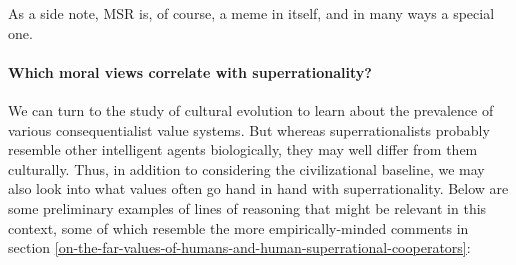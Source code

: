 As a side note, MSR is, of course, a meme in itself, and in many ways a
special one.

\paragraph{Which moral views correlate with
superrationality?}\label{which-moral-views-correlate-with-superrationality}

We can turn to the study of cultural evolution to learn about the
prevalence of various consequentialist value systems. But whereas
superrationalists probably resemble other intelligent agents
biologically, they may well differ from them culturally. Thus, in
addition to considering the civilizational baseline, we may also look
into what values often go hand in hand with superrationality. Below are
some preliminary examples of lines of reasoning that might be relevant
in this context, some of which resemble the more empirically-minded
comments in section \ref{on-the-far-values-of-humans-and-human-superrational-cooperators}:

